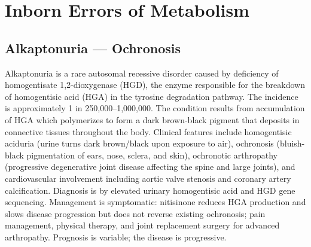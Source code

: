 \section{Inborn Errors of Metabolism}








\label{sec:Inborn Errors of Metabolism}

\subsection{Alkaptonuria --- Ochronosis}
\label{sec:Alkaptonuria}
Alkaptonuria is a rare autosomal recessive disorder caused by deficiency of homogentisate 1,2-dioxygenase (HGD), the enzyme responsible for the breakdown of homogentisic acid (HGA) in the tyrosine degradation pathway. The incidence is approximately 1 in 250,000--1,000,000. The condition results from accumulation of HGA which polymerizes to form a dark brown-black pigment that deposits in connective tissues throughout the body. Clinical features include homogentisic aciduria (urine turns dark brown/black upon exposure to air), ochronosis (bluish-black pigmentation of ears, nose, sclera, and skin), ochronotic arthropathy (progressive degenerative joint disease affecting the spine and large joints), and cardiovascular involvement including aortic valve stenosis and coronary artery calcification. Diagnosis is by elevated urinary homogentisic acid and HGD gene sequencing. Management is symptomatic: nitisinone reduces HGA production and slows disease progression but does not reverse existing ochronosis; pain management, physical therapy, and joint replacement surgery for advanced arthropathy. Prognosis is variable; the disease is progressive.

